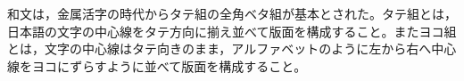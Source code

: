 和文は，金属活字の時代からタテ組の全角ベタ組が基本とされた。タテ組とは，日本語の文字の中心線をタテ方向に揃え並べて版面を構成すること。またヨコ組とは，文字の中心線はタテ向きのまま，アルファベットのように左から右へ中心線をヨコにずらすように並べて版面を構成すること\cite{handbook_of_typography}。
